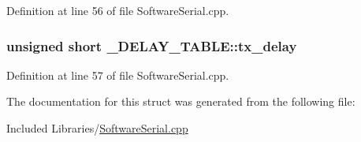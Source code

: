 \-Definition at line 56 of file \-Software\-Serial.\-cpp.

\hypertarget{struct___d_e_l_a_y___t_a_b_l_e_a20098fe273924c2456690a6ea96dc891}{
\subsubsection[{tx\-\_\-delay}]{\setlength{\rightskip}{0pt plus 5cm}unsigned short {\bf \-\_\-\-D\-E\-L\-A\-Y\-\_\-\-T\-A\-B\-L\-E\-::tx\-\_\-delay}}}\label{struct___d_e_l_a_y___t_a_b_l_e_a20098fe273924c2456690a6ea96dc891}


\-Definition at line 57 of file \-Software\-Serial.\-cpp.



\-The documentation for this struct was generated from the following file\-:\begin{DoxyCompactItemize}
\item 
\-Included Libraries/\hyperlink{_software_serial_8cpp}{\-Software\-Serial.\-cpp}\end{DoxyCompactItemize}
